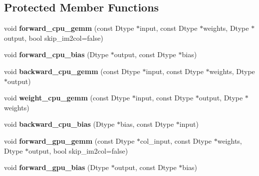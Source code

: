 \subsection*{Protected Member Functions}
\begin{DoxyCompactItemize}
\item 
void {\bfseries forward\+\_\+cpu\+\_\+gemm} (const Dtype $\ast$input, const Dtype $\ast$weights, Dtype $\ast$output, bool skip\+\_\+im2col=false)\hypertarget{classcaffe_1_1BaseConvolutionLayer_a2870d22074426089e31afd864b989743}{}\label{classcaffe_1_1BaseConvolutionLayer_a2870d22074426089e31afd864b989743}

\item 
void {\bfseries forward\+\_\+cpu\+\_\+bias} (Dtype $\ast$output, const Dtype $\ast$bias)\hypertarget{classcaffe_1_1BaseConvolutionLayer_a00ede6bbe48c3a6dedd21308a48f979f}{}\label{classcaffe_1_1BaseConvolutionLayer_a00ede6bbe48c3a6dedd21308a48f979f}

\item 
void {\bfseries backward\+\_\+cpu\+\_\+gemm} (const Dtype $\ast$input, const Dtype $\ast$weights, Dtype $\ast$output)\hypertarget{classcaffe_1_1BaseConvolutionLayer_a3006035856c7f49371fe2b93ed38c935}{}\label{classcaffe_1_1BaseConvolutionLayer_a3006035856c7f49371fe2b93ed38c935}

\item 
void {\bfseries weight\+\_\+cpu\+\_\+gemm} (const Dtype $\ast$input, const Dtype $\ast$output, Dtype $\ast$weights)\hypertarget{classcaffe_1_1BaseConvolutionLayer_aa0ce44e831ad98176dc8c06f2069df2e}{}\label{classcaffe_1_1BaseConvolutionLayer_aa0ce44e831ad98176dc8c06f2069df2e}

\item 
void {\bfseries backward\+\_\+cpu\+\_\+bias} (Dtype $\ast$bias, const Dtype $\ast$input)\hypertarget{classcaffe_1_1BaseConvolutionLayer_a840ea8c0a485047a9760b7194b68db0c}{}\label{classcaffe_1_1BaseConvolutionLayer_a840ea8c0a485047a9760b7194b68db0c}

\item 
void {\bfseries forward\+\_\+gpu\+\_\+gemm} (const Dtype $\ast$col\+\_\+input, const Dtype $\ast$weights, Dtype $\ast$output, bool skip\+\_\+im2col=false)\hypertarget{classcaffe_1_1BaseConvolutionLayer_ace6f5e890e06e4812cf10e841f279346}{}\label{classcaffe_1_1BaseConvolutionLayer_ace6f5e890e06e4812cf10e841f279346}

\item 
void {\bfseries forward\+\_\+gpu\+\_\+bias} (Dtype $\ast$output, const Dtype $\ast$bias)\hypertarget{classcaffe_1_1BaseConvolutionLayer_a2a1f9d98d332411a481d82c10d76b474}{}\label{classcaffe_1_1BaseConvolutionLayer_a2a1f9d98d332411a481d82c10d76b474}


\end{DoxyCompactItemize}

